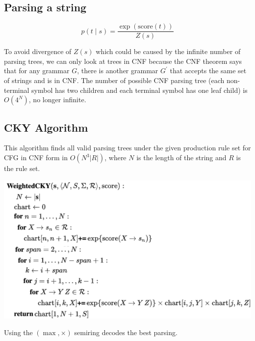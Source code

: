 \subsection*{Parsing a string}

\vspace{-0.4cm}
$$p(t\mid s) = \frac{\exp(\text{score}(t))}{Z(s)}$$
\vspace{-0.3cm}

To avoid divergence of $Z(s)$ which could be caused by the infinite number of parsing trees, we can only look at trees in CNF because the CNF theorem says that for any grammar $G$, there is another grammar $G^\prime$ that accepts the same set of strings and is in CNF. The number of possible CNF parsing tree (each non-terminal symbol has two children and each terminal symbol has one leaf child) is $O(4^N)$, no longer infinite.

\subsection*{CKY Algorithm}

This algorithm finds all valid parsing trees under the given production rule set for CFG in CNF form in $O(N^3 |R|)$, where $N$ is the length of the string and $R$ is the rule set.

\vspace{-0.4cm}
\begin{center}
    \includegraphics[width=\columnwidth]{img/CKY.png}
\end{center}
\vspace{-0.4cm}

Using the $(\max, \times)$ semiring decodes the best parsing.
